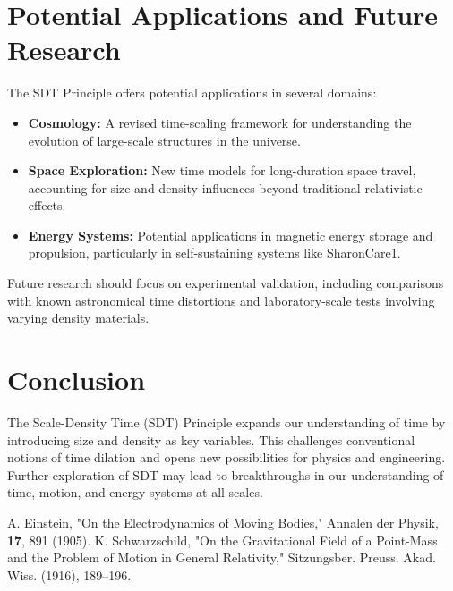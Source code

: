 \documentclass[aps,prl,twocolumn,superscriptaddress]{revtex4-2}
\begin{document}
\section{Potential Applications and Future Research}
The SDT Principle offers potential applications in several domains:

\begin{itemize}
    \item \textbf{Cosmology:} A revised time-scaling framework for understanding the evolution of large-scale structures in the universe.
    \item \textbf{Space Exploration:} New time models for long-duration space travel, accounting for size and density influences beyond traditional relativistic effects.
    \item \textbf{Energy Systems:} Potential applications in magnetic energy storage and propulsion, particularly in self-sustaining systems like SharonCare1.
\end{itemize}

Future research should focus on experimental validation, including comparisons with known astronomical time distortions and laboratory-scale tests involving varying density materials.

\section{Conclusion}
The Scale-Density Time (SDT) Principle expands our understanding of time by introducing size and density as key variables. This challenges conventional notions of time dilation and opens new possibilities for physics and engineering. Further exploration of SDT may lead to breakthroughs in our understanding of time, motion, and energy systems at all scales.

\begin{thebibliography}{9}
 A. Einstein, "On the Electrodynamics of Moving Bodies," Annalen der Physik, \textbf{17}, 891 (1905).
 K. Schwarzschild, "On the Gravitational Field of a Point-Mass and the Problem of Motion in General Relativity," Sitzungsber. Preuss. Akad. Wiss. (1916), 189–196.
\end{thebibliography}
\end{document}

